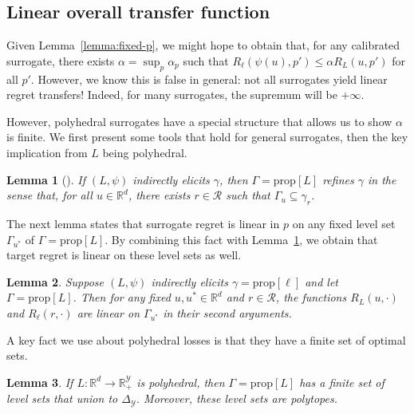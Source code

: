 \documentclass{article}
\newtheorem{lemma}{Lemma}
\theoremstyle{definition}\newtheorem{definition}{Definition}
\theoremstyle{definition}\newtheorem{assumption}{Assumption}
\newcommand{\Comments}{1}
\newcommand{\mynote}[2]{\ifnum\Comments=1\textcolor{#1}{#2}\fi}
\newcommand{\raf}[1]{\mynote{green}{[RF: #1]}}
\newcommand{\reals}{\mathbb{R}}
\newcommand{\prop}[1]{\mathrm{prop}[#1]}
\newcommand{\simplex}{\Delta_\Y}
\newcommand{\R}{\mathcal{R}}
\newcommand{\Y}{\mathcal{Y}}
\newcommand{\inprod}[2]{\langle #1, #2 \rangle}%
\begin{document}
\subsection{Linear overall transfer function}
Given Lemma~\ref{lemma:fixed-p}, we might hope to obtain that, for any calibrated surrogate, there exists $\alpha = \sup_p \alpha_p$ such that $R_{\ell}(\psi(u),p') \leq \alpha R_L(u,p')$ for all $p'$.
However, we know this is false in general: not all surrogates yield linear regret transfers!
Indeed, for many surrogates, the supremum will be $+\infty$.

However, polyhedral surrogates have a special structure that allows us to show $\alpha$ is finite.
We first present some tools that hold for general surrogates, then the key implication from $L$ being polyhedral.

\begin{lemma}[\cite{frongillo2020elicitation}] \label{lemma:refines}
  If $(L,\psi)$ indirectly elicits $\gamma$, then $\Gamma = \prop{L}$ \emph{refines} $\gamma$ in the sense that, for all $u \in \reals^d$, there exists $r \in \R$ such that $\Gamma_u \subseteq \gamma_r$.
\end{lemma}

The next lemma states that surrogate regret is linear in $p$ on any fixed level set $\Gamma_{u^*}$ of $\Gamma = \prop{L}$.
By combining this fact with Lemma~\ref{lemma:refines}, we obtain that target regret is linear on these level sets as well.
\begin{lemma} \label{lemma:linear-on-levelset}
  Suppose $(L,\psi)$ indirectly elicits $\gamma = \prop{\ell}$ and let $\Gamma = \prop{L}$.
  Then for any fixed $u,u^* \in \reals^d$ and $r \in \R$, the functions $R_L(u,\cdot)$ and $R_{\ell}(r,\cdot)$ are linear on $\Gamma_{u^*}$ in their second arguments.
\end{lemma}

A key fact we use about polyhedral losses is that they have a finite set of optimal sets.
\begin{lemma} \label{lemma:polyhedral-finite}
  If $L: \reals^d \to \reals_+^{\Y}$ is polyhedral, then $\Gamma = \prop{L}$ has a finite set of level sets that union to $\simplex$.
  Moreover, these level sets are polytopes.
\end{lemma}
\end{document}
